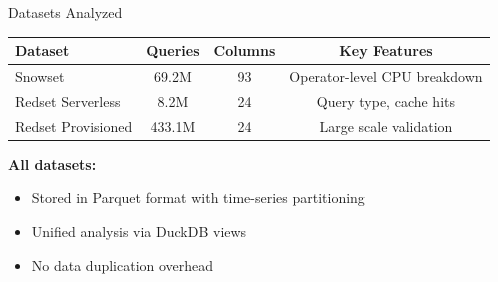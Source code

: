 \documentclass[aspectratio=169]{beamer}
\begin{document}
\begin{frame}{Datasets Analyzed}
    \begin{table}
        \centering
        \begin{tabular}{lccc}
            \toprule
            \textbf{Dataset} & \textbf{Queries} & \textbf{Columns} & \textbf{Key Features} \\
            \midrule
            Snowset & 69.2M & 93 & Operator-level CPU breakdown \\
            Redset Serverless & 8.2M & 24 & Query type, cache hits \\
            Redset Provisioned & 433.1M & 24 & Large scale validation \\
            \bottomrule
        \end{tabular}
    \end{table}
    
    \vspace{0.3cm}
    \textbf{All datasets:}
    \begin{itemize}
        \item Stored in Parquet format with time-series partitioning
        \item Unified analysis via DuckDB views
        \item No data duplication overhead
    \end{itemize}
\end{frame}
\end{document}
